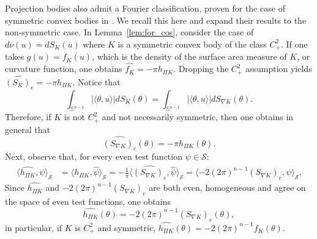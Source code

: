 \documentclass[11pt]{amsart}
\newtheorem{theorem}{Theorem}[section]
\newtheorem{lemma}[theorem]{Lemma}
\theoremstyle{definition}
\theoremstyle{remark}
\numberwithin{equation}{section}
\newcommand{\R}{\mathbb{R}}
\newcommand{\s}{\mathbb{S}}
\newcommand{\ct}[2]{\mathcal{C}({#1})({#2})}
\begin{document}

Projection bodies also admit a Fourier classification, proven for the case of symmetric convex bodies in \cite{KRZ04_1,KRZ04_2}. We recall this here and expand their results to the non-symmetric case. In Lemma~\ref{lem:for_cos}, consider the case of $d\nu(u)=dS_K(u)$ where $K$ is a symmetric convex body of the class $C^2_+$. If one takes $g(u)=f_K(u)$, which is the density of the surface area measure of $K$, or curvature function, one obtains
$\widehat{f_K}=-\pi h_{\Pi K}.$ Dropping the $C^2_+$ assumption yields $\widehat{(S_K)_e}=-\pi h_{\Pi K}$. Notice that
$$\int_{\s^{n-1}}|\langle\theta,u\rangle|dS_K(\theta)=\int_{\s^{n-1}}|\langle\theta,u\rangle|dS_{\nabla K}(\theta).$$
Therefore, if $K$ is not $C^2_+$ and not necessarily symmetric, then one obtains in general that
$$\widehat{(S_{\nabla K})_e}(\theta)=-\pi h_{\Pi K}(\theta).$$
Next, observe that, for every even test function $\psi\in\mathcal{S}$:
\begin{align*}\langle \widehat{h_{\Pi K}},\psi \rangle_{\mathcal{S}}&=\langle h_{\Pi K},\widehat{\psi} \rangle_{\mathcal{S}}
=-\frac{1}{\pi}\langle \widehat{(S_{\nabla K})_e},\widehat{\psi} \rangle_\mathcal{S}
=\langle -2(2\pi)^{n-1}(S_{\nabla K})_e ,\psi\rangle_{\mathcal{S}}.\end{align*}
Since $\widehat{h_{\Pi K}}$ and $-2(2\pi)^{n-1}(S_{\nabla K})_e$ are both even, homogeneous and agree on the space of even test functions, one obtains
$$\widehat{h_{\Pi K}}(\theta)=-2(2\pi)^{n-1}(S_{\nabla K})_e(\theta),$$
in particular, if $K$ is $C^2_+$ and symmetric,
$\widehat{h_{\Pi K}}(\theta)=-2(2\pi)^{n-1}f_{K}(\theta).$
\end{document}
